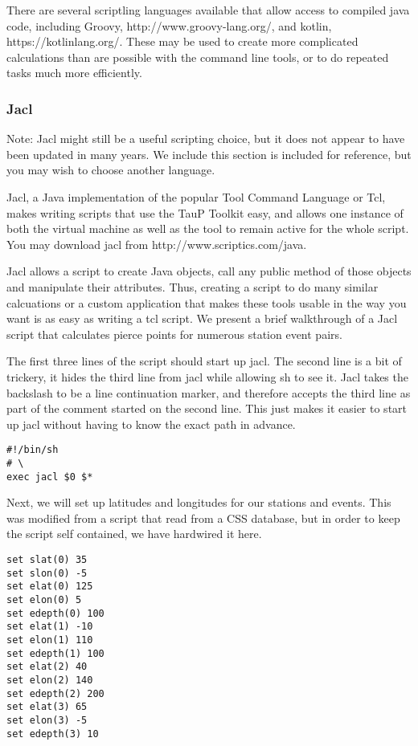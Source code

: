 There are several scriptling languages available that allow access to compiled
java code, including Groovy, http://www.groovy-lang.org/, and kotlin,
https://kotlinlang.org/. These may be used to create more complicated
calculations than are possible with the command line tools, or to do repeated
tasks much more efficiently.

\subsubsection{Jacl}

Note: Jacl might still be a useful scripting choice, but it does not appear to have
been updated in many years. We include this section is included for reference,
but you may wish to choose another language.

Jacl, a Java implementation of the popular Tool Command Language or Tcl,
makes writing scripts that use the TauP Toolkit easy, and allows one
instance of both the
virtual machine as well as the tool to remain active for the whole script.
You may download jacl from http://www.scriptics.com/java.

Jacl allows a script to create Java objects, call any public method of
those objects and manipulate their attributes. Thus, creating a script
to do many similar calcuations or a custom application that makes these tools
usable in the way you want is as easy as writing a tcl script. We present a
brief walkthrough of a Jacl script that calculates pierce points for
numerous station event pairs.

The first three lines of the script should start up jacl. The second line is
a bit of trickery, it hides the third line from jacl while allowing sh to see
it. Jacl takes the backslash to be a line continuation marker, and therefore
accepts the third line as part of the comment started on the second line.
This just makes it easier to start up jacl without having to know the exact
path in advance.

\begin{verbatim}
#!/bin/sh
# \
exec jacl $0 $*
\end{verbatim}

Next, we will set up latitudes and longitudes for our stations and events.
This was modified from a script that read from a CSS database, but in
order to keep the script self contained, we have hardwired it here.
\begin{verbatim}
set slat(0) 35
set slon(0) -5
set elat(0) 125
set elon(0) 5
set edepth(0) 100
set elat(1) -10
set elon(1) 110
set edepth(1) 100
set elat(2) 40
set elon(2) 140
set edepth(2) 200
set elat(3) 65
set elon(3) -5
set edepth(3) 10
\end{verbatim}

